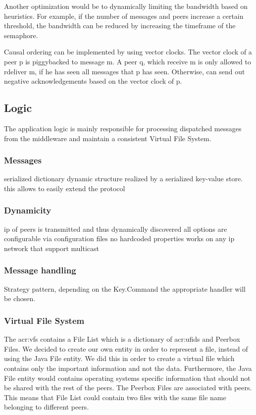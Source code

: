 Another optimization would be to dynamically limiting the bandwidth based on heuristics. For example, if the number of messages and peers increase a certain threshold, the bandwidth can be reduced by increasing the timeframe of the semaphore. 

Causal ordering can be implemented by using vector clocks. The vector clock of a peer p is piggybacked to message m. A peer q, which receive m is only allowed to rdeliver m, if he has seen all messages that p has seen. Otherwise, can send out negative acknowledgements based on the vector clock of p. 

\subsection{Logic}

The application logic is mainly responsible for processing dispatched messages from the middleware and maintain a consistent Virtual File System.


\subsubsection{Messages}   
serialized dictionary
dynamic structure realized by a serialized key-value store. 
this allows to easily extend the protocol

\subsubsection{Dynamicity}
ip of peers is transmitted and thus dynamically discovered
all options are configurable via configuration files
no hardcoded properties
works on any ip network that support multicast


\subsubsection{Message handling}
Strategy pattern, depending on the Key.Command the appropriate handler will be chosen.


\subsubsection{Virtual File System}
    
The \gls{acr:vfs} contains a File List which is a dictionary of \glspl{acr:ufid} and Peerbox Files. We decided to create our own entity in order to represent a file, instead of using the Java File entity. We did this in order to create a virtual file which contains only the important information and not the data. Furthermore, the Java File entity would contains operating systems specific information that should not be shared with the rest of the peers. The Peerbox Files are associated with peers. This means that File List could contain two files with the same file name belonging to different peers.
    
